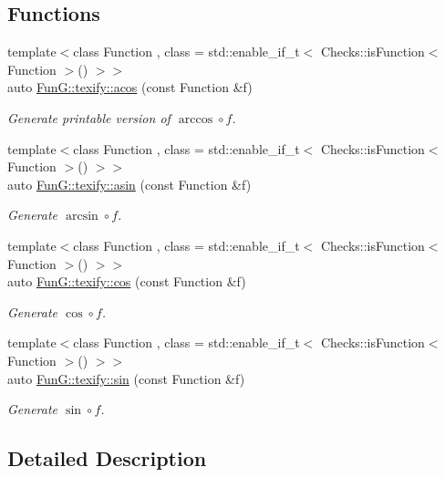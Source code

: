 \subsection*{Functions}
\begin{DoxyCompactItemize}
\item 
{\footnotesize template$<$class Function , class  = std\-::enable\-\_\-if\-\_\-t$<$ Checks\-::is\-Function$<$ Function $>$() $>$$>$ }\\auto \hyperlink{group__TexifyCMathGroup_ga25006ed8aa960202cb697a70cd177070}{Fun\-G\-::texify\-::acos} (const Function \&f)
\begin{DoxyCompactList}\small\item\em Generate printable version of $ \arccos\circ f $. \end{DoxyCompactList}\item 
{\footnotesize template$<$class Function , class  = std\-::enable\-\_\-if\-\_\-t$<$ Checks\-::is\-Function$<$ Function $>$() $>$$>$ }\\auto \hyperlink{group__TexifyCMathGroup_ga77ad61e040073cf18fe4d1a58524d733}{Fun\-G\-::texify\-::asin} (const Function \&f)
\begin{DoxyCompactList}\small\item\em Generate $ \arcsin\circ f $. \end{DoxyCompactList}\item 
{\footnotesize template$<$class Function , class  = std\-::enable\-\_\-if\-\_\-t$<$ Checks\-::is\-Function$<$ Function $>$() $>$$>$ }\\auto \hyperlink{group__TexifyCMathGroup_gabbc13b57ec7a869d087fb33109faa98e}{Fun\-G\-::texify\-::cos} (const Function \&f)
\begin{DoxyCompactList}\small\item\em Generate $ \cos\circ f $. \end{DoxyCompactList}\item 
{\footnotesize template$<$class Function , class  = std\-::enable\-\_\-if\-\_\-t$<$ Checks\-::is\-Function$<$ Function $>$() $>$$>$ }\\auto \hyperlink{group__TexifyCMathGroup_ga73e1c9636b3a075b61f8a3b00caea13f}{Fun\-G\-::texify\-::sin} (const Function \&f)
\begin{DoxyCompactList}\small\item\em Generate $ \sin\circ f $. \end{DoxyCompactList}\end{DoxyCompactItemize}


\subsection{Detailed Description}


